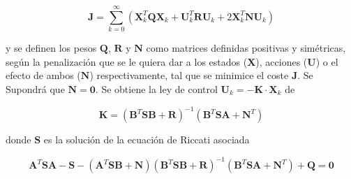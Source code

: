 \documentclass[twoside,11pt]{book}
\begin{document}
\begin{equation}
\mathbf{J} =\sum^{\infty}_{k=0} \left( \mathbf{X}^{T}_{k} \mathbf{Q}\pmb{X}_{k} + \mathbf{U}^{T}_{k} \mathbf{R}\mathbf{U}_{k} + 2\mathbf{X}^{T}_{k} \mathbf{N}\mathbf{U}_{k} \right)
\end{equation}

y se definen los pesos $\mathbf{Q}$, $\mathbf{R}$ y $\mathbf{N}$ como matrices definidas positivas y simétricas, según la penalización que se le quiera dar a los estados ($\mathbf{X}$), acciones ($\mathbf{U}$) o el efecto de ambos ($\mathbf{N}$) respectivamente, tal que se minimice el coste $\mathbf{J}$. Se Supondrá que $\mathbf{N}=\pmb{0}$. Se obtiene la ley de control $\mathbf{U}_{k}=-\mathbf{K} \cdot \mathbf{X}_{k}$ de 


\begin{equation}
\mathbf{K}=(\mathbf{B}^{T}\mathbf{S}\mathbf{B}+\mathbf{R})^{-1}(\mathbf{B}^{T}\mathbf{S}\mathbf{A}+\mathbf{N}^{T})
\end{equation}

donde $\mathbf{S}$ es la solución de la ecuación de Riccati asociada 


\begin{equation}
\mathbf{A}^{T}\mathbf{S}\mathbf{A}-\mathbf{S}-(\mathbf{A}^{T}\mathbf{S}\mathbf{B}+\mathbf{N})(\mathbf{B}^{T}\mathbf{S}\mathbf{B}+\mathbf{R})^{-1}(\mathbf{B}^{T}\mathbf{S}\mathbf{A}+\mathbf{N}^{T})+\mathbf{Q}=\mathbf{0}
\end{equation}



\end{document}
